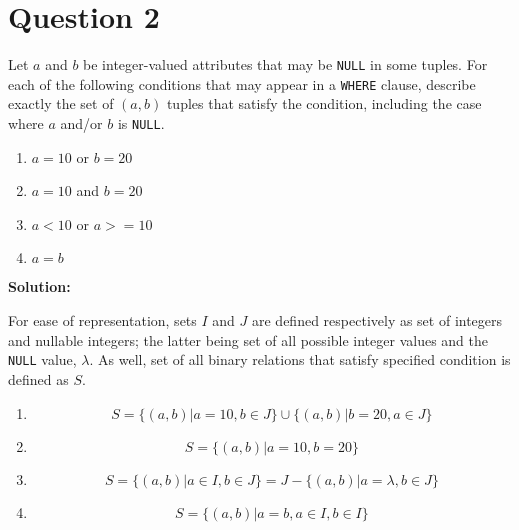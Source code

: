 
\section*{Question 2}

Let $a$ and $b$ be integer-valued attributes that may be \texttt{NULL} in some tuples.
For each of the following conditions that may appear in a \texttt{WHERE} clause, describe exactly the set of $(a,b)$ tuples that satisfy the condition, including the case where $a$ and/or $b$ is \texttt{NULL}.

\begin{enumerate}[label=(\alph*)]
\item $a=10$ or $b=20$
\item $a=10$ and $b=20$
\item $a<10$ or $a>=10$
\item $a=b$
\end{enumerate}

\textbf{Solution:}

For ease of representation, sets $I$ and $J$ are defined respectively as set of integers and nullable integers; the latter being set of all possible integer values and the \texttt{NULL} value, $\lambda$.
As well, set of all binary relations that satisfy specified condition is defined as $S$.

\begin{enumerate}[label=(\alph*)]
\item
\begin{equation}\nonumber
S = \{ (a,b) | a = 10, b\in J \} \cup \{ (a,b) | b = 20, a\in J \}
\end{equation}
\item
\begin{equation}\nonumber
S = \{ (a,b) | a = 10, b = 20 \}
\end{equation}
\item
\begin{equation}\nonumber
S = \{ (a,b) | a \in I, b \in J\}= J - \{(a,b)|a = \lambda , b \in J\}
\end{equation}
\item
\begin{equation}\nonumber
S = \{ (a,b) | a = b, a \in I, b \in I\}
\end{equation}

\end{enumerate}
